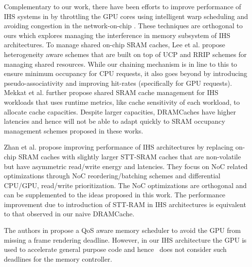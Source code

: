 \par Complementary to our work, there have been efforts to improve performance of IHS systems in \cite{gpu-concurrency} by throttling the GPU cores using intelligent warp scheduling and avoiding congestion in the network-on-chip \cite{interconnect}. These techniques are orthogonal to ours which explores managing the interference in memory subsystem of IHS architectures. To manage shared on-chip SRAM caches, Lee et al. \cite{tap} propose heterogeneity aware schemes that are built on top of UCP and RRIP schemes for managing shared  resources. While our chaining mechanism is in line to this to ensure minimum occupancy for CPU requests, it also goes beyond by introducing pseudo-associativity and improving hit-rates (specifically for GPU requests). Mekkat et al. \cite{helm} further propose shared SRAM cache management for IHS workloads that uses runtime metrics, like cache sensitivity of each workload, to allocate cache capacities. Despite larger capacities, DRAMCaches have higher latencies and hence will not be able to adapt quickly to SRAM occupancy management schemes proposed in these works.
\par Zhan et al. \cite{oscar} propose improving performance of IHS architectures by replacing on-chip SRAM caches with slightly larger STT-SRAM caches that are non-volatile but have asymmetric read/write energy and latencies. They focus on NoC related optimizations through NoC reordering/batching schemes and differential CPU/GPU, read/write prioritization. The NoC optimizations are orthogonal and can be supplemented to the ideas proposed in this work. The performance improvement due to introduction of STT-RAM in IHS architectures is equivalent to that observed in our naive DRAMCache.
\par The authors in \cite{qos-aware} propose a QoS aware memory scheduler to avoid the GPU from missing a frame rendering deadline. However, in our IHS architecture the GPU is used to accelerate general purpose code and hence \prioname\ does not consider such deadlines for the memory controller.

